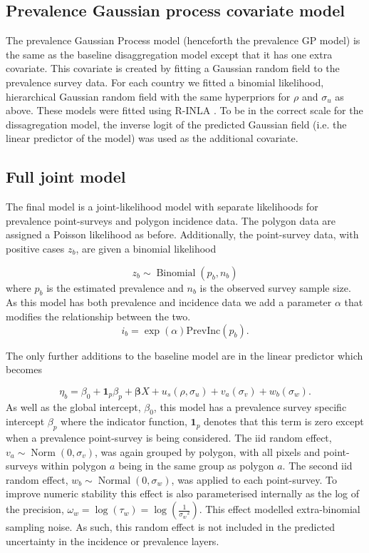 \documentclass{statsoc}
\begin{document}
\subsection*{Prevalence Gaussian process covariate model}

The prevalence Gaussian Process model (henceforth the prevalence GP model) is the same as the baseline disaggregation model except that it has one extra covariate.
This covariate is created by fitting a Gaussian random field to the prevalence survey data.
For each country we fitted a binomial likelihood, hierarchical Gaussian random field with the same hyperpriors for $\rho$ and $\sigma_u$ as above.
These models were fitted using R-INLA \citep{INLA}.
To be in the correct scale for the dissagregation model, the inverse logit of the predicted Gaussian field (i.e. the linear predictor of the model) was used as the additional covariate.

\subsection*{Full joint model}

The final model is a joint-likelihood model with separate likelihoods for prevalence point-surveys and polygon incidence data.
The polygon data are assigned a Poisson likelihood as before.
Additionally, the point-survey data, with positive cases $z_b$, are given a binomial likelihood

$$z_b \sim \operatorname{Binomial}(p_b, n_b) $$
where $p_b$ is the estimated prevalence and $n_b$ is the observed survey sample size. 
As this model has both prevalence and incidence data we add a parameter $\alpha$ that modifies the relationship between the two.
$$i_b = \exp(\alpha)\mathrm{PrevInc}(p_b).$$

The only further additions to the baseline model are in the linear predictor which becomes 

$$\eta_b = \beta_0 + \mathbf{1}_p\beta_p +  \boldsymbol\beta X  + u_s(\rho, \sigma_u) + v_a(\sigma_v) + w_b(\sigma_w).$$
As well as the global intercept, $\beta_0$, this model has a prevalence survey specific intercept $\beta_p$ where the indicator function, $\mathbf{1}_p$ denotes that this term is zero except when a prevalence point-survey is being considered.
The iid random effect, $v_a \sim \operatorname{Norm}(0, \sigma_v)$, was again grouped by polygon, with all pixels and point-surveys within polygon $a$ being in the same group as polygon $a$.
The second iid random effect, $w_b \sim \operatorname{Normal}(0, \sigma_w)$, was applied to each point-survey.
To improve numeric stability this effect is also parameterised internally as the log of the precision, $\omega_w = \log(\tau_w) = \log(\frac{1}{{\sigma_w}^2})$.
This effect modelled extra-binomial sampling noise.
As such, this random effect is not included in the predicted uncertainty in the incidence or prevalence layers.
\end{document}
